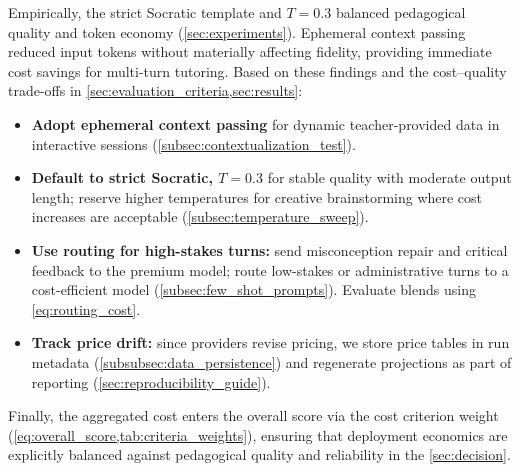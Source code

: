 Empirically, the strict Socratic template and $T=0.3$ balanced pedagogical quality and token economy (\cref{sec:experiments}). Ephemeral context passing reduced input tokens without materially affecting fidelity, providing immediate cost savings for multi-turn tutoring. Based on these findings and the cost–quality trade-offs in \cref{sec:evaluation_criteria,sec:results}:

\begin{itemize}
	\item \textbf{Adopt ephemeral context passing} for dynamic teacher-provided data in interactive sessions (\cref{subsec:contextualization_test}).
	\item \textbf{Default to strict Socratic, $T=0.3$} for stable quality with moderate output length; reserve higher temperatures for creative brainstorming where cost increases are acceptable (\cref{subsec:temperature_sweep}).
	\item \textbf{Use routing for high-stakes turns:} send misconception repair and critical feedback to the premium model; route low-stakes or administrative turns to a cost-efficient model (\cref{subsec:few_shot_prompts}). Evaluate blends using \cref{eq:routing_cost}.
	\item \textbf{Track price drift:} since providers revise pricing, we store price tables in run metadata (\cref{subsubsec:data_persistence}) and regenerate projections as part of reporting (\cref{sec:reproducibility_guide}).
\end{itemize}

Finally, the aggregated cost enters the overall score via the cost criterion weight (\cref{eq:overall_score,tab:criteria_weights}), ensuring that deployment economics are explicitly balanced against pedagogical quality and reliability in the \cref{sec:decision}.
